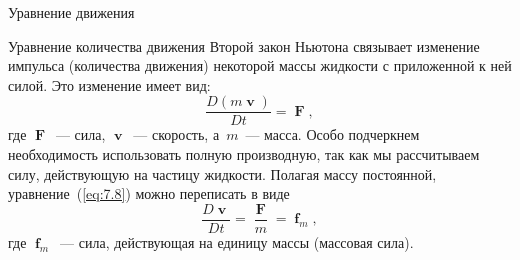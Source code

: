 \begin{chapter}{Уравнение движения}
\begin{section}{Уравнение количества движения}
Второй закон Ньютона связывает изменение импульса (количества движения) 
некоторой массы жидкости с приложенной к ней силой. Это изменение имеет вид:
\begin{equation}\label{eq:7.8}
 \frac{D(m\mbfv)}{Dt} = \mbfF,
\end{equation}
где $\mbfF$~--- сила, $\mbfv$~--- скорость, а~$m$~--- масса. 
Особо подчеркнем необходимость использовать полную производную, так как мы
рассчитываем силу, действующую на частицу жидкости. Полагая массу постоянной,
уравнение~(\ref{eq:7.8}) можно переписать в виде
\begin{equation}\label{eq:7.9}
 \frac{D\mbfv}{Dt} = \frac{\mbfF}{m} = \mbff_m,
\end{equation}
где $\mbff_m$~--- сила, действующая на единицу массы (массовая сила).
%


\end{section}
\end{chapter}
